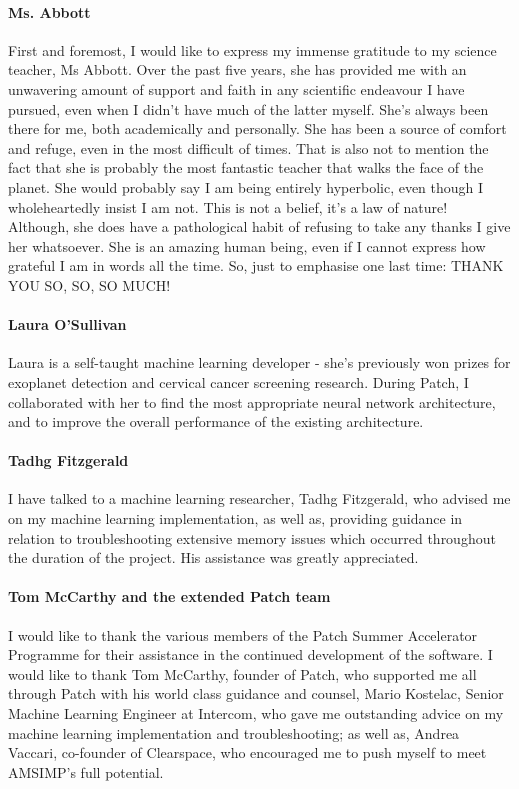 \paragraph{Ms. Abbott} First and foremost, I would like to express my immense gratitude to my science teacher, Ms Abbott. Over the past five years, she has provided me with an unwavering amount of support and faith in any scientific endeavour I have pursued, even when I didn't have much of the latter myself. She’s always been there for me, both academically and personally. She has been a source of comfort and refuge, even in the most difficult of times. That is also not to mention the fact that she is probably the most fantastic teacher that walks the face of the planet. She would probably say I am being entirely hyperbolic, even though I wholeheartedly insist I am not. This is not a belief, it's a law of nature! Although, she does have a pathological habit of refusing to take any thanks I give her whatsoever. She is an amazing human being, even if I cannot express how grateful I am in words all the time. So, just to emphasise one last time:  THANK YOU SO, SO, SO MUCH!

\paragraph{Laura O'Sullivan}
Laura is a self-taught machine learning developer - she’s previously won prizes for exoplanet detection and cervical cancer screening research. During Patch, I collaborated with her to find the most appropriate neural network architecture, and to improve the overall performance of the existing architecture.

\paragraph{Tadhg Fitzgerald}
I have talked to a machine learning researcher, Tadhg Fitzgerald, who advised me on my machine learning implementation, as well as, providing guidance in relation to troubleshooting extensive memory issues which occurred throughout the duration of the project. His assistance was greatly appreciated.

\paragraph{Tom McCarthy and the extended Patch team}
I would like to thank the various members of the Patch Summer Accelerator Programme for their assistance in the continued development of the software. I would like to thank Tom McCarthy, founder of Patch, who supported me all through Patch with his world class guidance and counsel, Mario Kostelac, Senior Machine Learning Engineer at Intercom, who gave me outstanding advice on my machine learning implementation and troubleshooting; as well as, Andrea Vaccari, co-founder of Clearspace, who encouraged me to push myself to meet AMSIMP’s full potential. 

